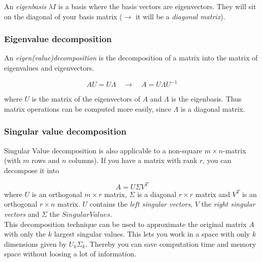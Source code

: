 \documentclass[
]{book}
\begin{document}
An \emph{eigenbasis} \(\lambda I\) is a basis where the basis vectors are
eigenvectors. They will sit on the diagonal of your basis matrix
(\(\rightarrow\) it will be a \emph{diagonal matrix}).

\hypertarget{EV_Dec}{%
\subsubsection{Eigenvalue decomposition}\label{EV_Dec}}

An \emph{eigen(value)decomposition} is the decomposition of a matrix into the
matrix of eigenvalues and eigenvectors.

\[
AU = U \Lambda  \quad \rightarrow \quad A = U \Lambda U^{-1}
\]

where \(U\) is the matrix of the eigenvectors of \(A\) and \(\Lambda\) is the
eigenbasis. Thus matrix operations can be computed more easily, since
\(\Lambda\) is a diagonal matrix.

\hypertarget{SVD1}{%
\subsubsection{Singular value decomposition}\label{SVD1}}

Singular Value decomposition is also applicable to a non-square
\(m \times n\)-matrix (with \(m\) rows and \(n\) columns). If you have a
matrix with rank \(r\), you can decompose it into

\[
A = U \Sigma V^T
\] where \(U\) is an orthogonal \(m \times r\) matrix, \(\Sigma\) is a
diagonal \(r \times r\) matrix and \(V^T\) is an orthogonal \(r \times n\)
matrix. \(U\) contains the \emph{left singular vectors}, \(V\) the \emph{right
singular vectors} and \(\Sigma\) the \(Singular Values\).\\
This decomposition technique can be used to approximate the original
matrix \(A\) with only the \(k\) largest singular values. This lets you work
in a space with only \(k\) dimensions given by \(U_k \Sigma_k\). Thereby you
can save computation time and memory space without loosing a lot of
information.
\end{document}
